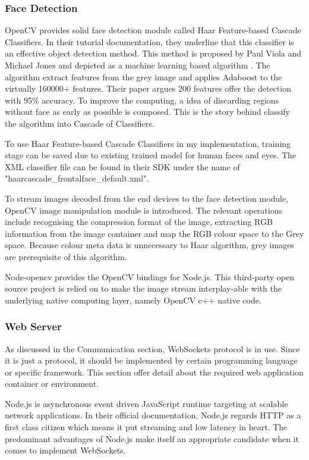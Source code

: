 \subsubsection{Face Detection}
OpenCV provides solid face detection module called Haar Feature-based Cascade Classifiers\cite{opencv_library}. In their tutorial documentation, they underline that this classifier is an effective object detection method. This method is proposed by Paul Viola and Michael Jones and depicted as a machine learning based algorithm \cite{viola2001rapid}. The algorithm extract features from the grey image and applies Adaboost to the virtually 160000+ features. Their paper argues 200 features offer the detection with 95\% accuracy. To improve the computing, a idea of discarding regions without face as early as possible is composed. This is the story behind classify the algorithm into Cascade of Classifiers.

To use Haar Feature-based Cascade Classifiers in my implementation, training stage can be saved due to existing trained model for human faces and eyes. The XML classifier file can be found in their SDK under the name of "haarcascade\_frontalface\_default.xml".

To stream images decoded from the end devices to the face detection module, OpenCV image manipulation module is introduced. The relevant operations include recognising the compression format of the image, extracting RGB information from the image container and map the RGB colour space to the Grey space. Because colour meta data is unnecessary to Haar algorithm, grey images are prerequisite of this algorithm.

Node-opencv provides the OpenCV bindings for Node.js\cite{node-opencv}. This third-party open source project is relied on to make the image stream interplay-able with the underlying native computing layer, namely OpenCV c++ native code.

\subsubsection{Web Server}
As discussed in the Communication section, WebSockets protocol is in use. Since it is just a protocol, it should be implemented by certain programming language or specific framework. This section offer detail about the required web application container or environment. 

Node.js is asynchronous event driven JavaScript runtime targeting at scalable network applications\cite{nodejs}. In their official documentation, Node.js regards HTTP as a first class citizen which means it put streaming and low latency in heart. The predominant advantages of Node.js make itself an appropriate candidate when it comes to implement WebSockets.

